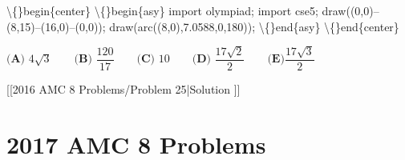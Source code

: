 \documentclass{article}
\begin{document}
\begin{enumerate}[label=\arabic*., itemsep=0.5em]
\textbackslash\{\}begin\{center\}
\textbackslash\{\}begin\{asy\}
import olympiad;
import cse5;
draw((0,0)--(8,15)--(16,0)--(0,0));
draw(arc((8,0),7.0588,0,180));
\textbackslash\{\}end\{asy\}
\textbackslash\{\}end\{center\}


\(\textbf{(A) }4 \sqrt{3}\qquad\textbf{(B) } \dfrac{120}{17}\qquad\textbf{(C) }10\qquad\textbf{(D) }\dfrac{17\sqrt{2}}{2}\qquad \textbf{(E)} \dfrac{17\sqrt{3}}{2}\)

[[2016 AMC 8 Problems/Problem 25|Solution
]]\par \vspace{0.5em}\end{enumerate}\newpage\section*{2017 AMC 8 Problems}
\end{document}
